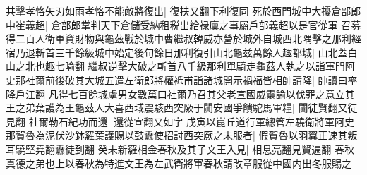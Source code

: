 共擊孝恪矢刃如雨孝恪不能敵將復出|{
	復扶又翻下利復同}
死於西門城中大擾倉部郎中崔義超|{
	倉部郎掌判天下倉儲受納租税出給禄廩之事屬戶部義超以是官從軍}
召募得二百人衛軍資財物與龜茲戰於城中曹繼叔韓威亦營於城外自城西北隅擊之那利經宿乃退斬首三千餘級城中始定後旬餘日那利復引山北龜兹萬餘人趣都城|{
	山北蓋白山之北也趣七喻翻}
繼叔逆擊大破之斬首八千級那利單騎走龜茲人執之以詣軍門阿史那社爾前後破其大城五遣左衛郎將權袛甫詣諸城開示禍福皆相帥請降|{
	帥讀曰率降戶江翻}
凡得七百餘城虜男女數萬口社爾乃召其父老宣國威靈諭以伐罪之意立其王之弟葉護為王龜茲人大喜西域震駭西突厥于闐安國爭饋駝馬軍糧|{
	闐徒賢翻又徒見翻}
社爾勒石紀功而還|{
	還從宣翻又如字}
戊寅以崑丘道行軍總管左驍衛將軍阿史那賀魯為泥伏沙鉢羅葉護賜以鼓纛使招討西突厥之未服者|{
	假賀魯以羽翼正速其叛耳驍堅堯翻纛徒到翻}
癸未新羅相金春秋及其子文王入見|{
	相息亮翻見賢遍翻}
春秋真德之弟也上以春秋為特進文王為左武衛將軍春秋請改章服從中國内出冬服賜之

